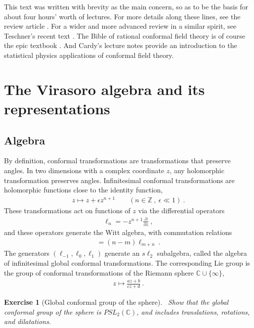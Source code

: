 \documentclass[12pt, a4paper]{article}
\theoremstyle{break}
\newtheorem{exo}{Exercise}[section]
\begin{document}
This text was written with brevity as the main concern, so as to be the basis for about four hours' worth of lectures. For more details along these lines, see the review article \cite{rib14}. For a wider and more advanced review in a similar spirit, see Teschner's recent text \cite{tes17}. 
The Bible of rational conformal field theory is of course the epic textbook \cite{fms97}. And Cardy's lecture notes \cite{car08} provide an introduction to the statistical physics applications of conformal field theory.


\section{The Virasoro algebra and its representations}

\subsection{Algebra}

By definition, conformal transformations are transformations that preserve angles. 
In two dimensions with a complex coordinate $z$, any holomorphic transformation preserves angles.
Infinitesimal conformal transformations are holomorphic functions close to the identity function, 
\begin{align}
 z \mapsto z + \epsilon z^{n+1}\qquad (n\in\mathbb{Z}\ , \ \epsilon\ll 1) \ .
\end{align}
These transformations act on functions of $z$ via the differential operators 
\begin{align}
 \ell_n = -z^{n+1}\frac{\partial}{\partial z}\ ,
\end{align}
and these operators generate the Witt algebra, with commutation relations
\begin{align}
 [\ell_n,\ell_m ] = (n-m)\ell_{m+n}\ .
\end{align}
The generators $(\ell_{-1},\ell_0,\ell_1)$ generate an $s\ell_2$ subalgebra, called the algebra of infinitesimal global conformal transformations.  The corresponding Lie group is the group of conformal transformations of 
the Riemann sphere $\mathbb{C}\cup \{\infty\}$,
\begin{align}
 z \mapsto \frac{az+b}{cz+d}\ .
\end{align}

\begin{exo}[Global conformal group of the sphere]
 ~\label{exo:sphere}
Show that the global conformal group of the sphere is $PSL_2(\mathbb{C})$, and includes translations, rotations, and dilatations. 
\end{exo}
\end{document}
